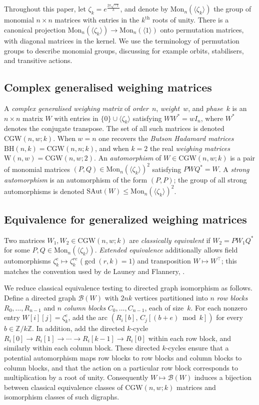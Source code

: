 \documentclass{article}
\theoremstyle{definition}
\theoremstyle{remark}
\newcommand{\Z}{\mathbb{Z}}
\newcommand{\CGW}{\mathrm{CGW}}
\newcommand{\BH}{\mathrm{BH}}
\newcommand{\We}{\mathrm{W}}
\newcommand{\SAut}{\mathrm{SAut}}
\newcommand{\Mon}{\mathrm{Mon}}
\begin{document}
Throughout this paper, let $\zeta_{k} = e^{\frac{2\pi\sqrt{-1}}{k}}$, and denote by $\Mon_{n}(\langle \zeta_{k} \rangle)$ the group of monomial $n \times n$ matrices with entries in the $k^{\textrm{th}}$ roots of unity. There is a canonical projection $\Mon_{n}(\langle \zeta_{k} \rangle) \rightarrow \Mon_n(\langle 1\rangle)$ onto permutation matrices, with diagonal matrices in the kernel. We use the terminology of permutation groups to describe monomial groups, discussing for example orbits, stabilisers, and transitive actions.

\subsection{Complex generalised weighing matrices}

A \textit{complex generalised weighing matrix} of \textit{order}~$n$, \textit{weight}~$w$, and \textit{phase}~$k$ is an $n \times n$ matrix $W$ with entries in $\{0\} \cup \langle \zeta_k \rangle$ satisfying $WW^{\ast} = wI_n$, where $W^{\ast}$ denotes the conjugate transpose. The set of all such matrices is denoted $\CGW(n, w; k)$. When $w = n$ one recovers the \textit{Butson Hadamard matrices} $\BH(n, k) = \CGW(n, n; k)$, and when $k = 2$ the real \textit{weighing matrices} $\We(n, w) = \CGW(n, w; 2)$. An \textit{automorphism} of $W \in \CGW(n,w;k)$ is a pair of monomial matrices $(P, Q) \in \Mon_n(\langle \zeta_k \rangle)^2$ satisfying $PWQ^{\ast} = W$. A \textit{strong automorphism} is an automorphism of the form $(P,P)$; the group of all strong automorphisms is denoted $\SAut(W) \leq \Mon_n(\langle \zeta_k \rangle)^2$.

\subsection{Equivalence for generalized weighing matrices}\label{sec:equiv}

Two matrices $W_1, W_2 \in \CGW(n,w;k)$ are \textit{classically equivalent} if $W_2 = PW_1Q^{\ast}$ for some $P, Q \in \Mon_n(\langle\zeta_k\rangle)$. \textit{Extended equivalence} additionally allows field automorphisms $\zeta_k^e \mapsto \zeta_k^{re}$ ($\gcd(r,k)=1$) and transposition $W \mapsto W^\top$;
this matches the convention used by de Launey and Flannery, \cite{DeLauneyFlannery}. 

We reduce classical equivalence testing to directed graph isomorphism as follows. Define a directed graph $\mathcal{B}(W)$ with $2nk$ vertices partitioned into $n$ \textit{row blocks} $R_0,\ldots,R_{n-1}$ and $n$ \textit{column blocks} $C_0,\ldots,C_{n-1}$, each of size~$k$.  For each nonzero entry $W[i][j]=\zeta_k^e$, add the arc $(R_i[b],\, C_j[(b+e)\bmod k])$ for every $b\in\Z/k\Z$.  In addition,
add the directed $k$-cycle $R_i[0]\to R_i[1]\to\cdots\to R_i[k-1]\to R_i[0]$ within
each row block, and similarly within each column block. These directed $k$-cycles ensure that a potential automorphism maps row blocks to row blocks and column blocks to column blocks, and that the action on a particular row block corresponds to multiplication by a root of unity.
Consequently $W\mapsto\mathcal{B}(W)$ induces a bijection between classical
equivalence classes of $\CGW(n,w;k)$ matrices and isomorphism classes of
such digraphs. 
\end{document}
